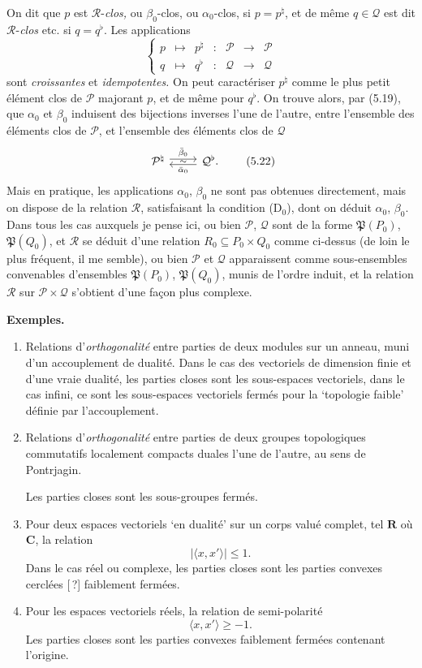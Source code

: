 \documentclass[11pt]{article}
\def\dcprintedpending{}
\newcommand{\msp}[1]{\marginpar{\footnotesize\raggedright
  \ifx\dcprintedpending\empty\else p.~\dcprintedpending\par\fi
  [#1]}\gdef\dcprintedpending{}}
\newcommand{\cP}{\mathcal{P}}
\newcommand{\cQ}{\mathcal{Q}}
\newcommand{\cR}{\mathcal{R}}
\newcommand{\fP}{\mathfrak{P}}
\begin{document}
On dit que $p$ est $\cR$-\textit{clos,} ou $\beta_0$-clos, ou $\alpha_0$-clos, si $p = p^{\natural}$, et de même $q \in \cQ$ est dit $\cR$-\textit{clos} etc. si $q = q^{\flat}$. Les applications
\[
\left\{
\begin{array}{ccccccc}
p & \longmapsto & p^{\natural} & : & \cP & \longrightarrow & \cP\\[1ex]
q & \longmapsto & q^{\flat} & : & \cQ & \longrightarrow & \cQ
\end{array}
\right.
\tag*{(5.21)}
\]
sont \textit{croissantes} et \textit{idempotentes.} On peut caractériser $p^{\natural}$ comme le plus petit élément clos de $\cP$ majorant $p$, et de même pour $q^{\flat}$. On trouve alors, par (5.19), que $\alpha_0$ et $\beta_0$ induisent des bijections inverses l'une de l'autre,
\msp{78}
entre l'ensemble des éléments clos de $\cP$, et l'ensemble des éléments clos de $\cQ$
\[
\begin{tikzcd}
\cP^{\natural} \arrow[r, shift left, "\bar{\beta}_0"] \arrow[r, phantom, "\scriptstyle\sim"] & \cQ^{\flat}. \arrow[l, shift left, "\bar{\alpha}_0"]
\end{tikzcd}
\tag*{(5.22)}
\]
Mais en pratique, les applications $\alpha_0$, $\beta_0$ ne sont pas obtenues directement, mais on dispose de la relation $\cR$, satisfaisant la condition (D$_0$), dont on déduit $\alpha_0$, $\beta_0$. Dans tous les cas auxquels je pense ici, ou bien $\cP$, $\cQ$ sont de la forme $\fP(P_0)$, $\fP(Q_0)$, et $\cR$ se déduit d'une relation $R_0 \subseteq P_0 \times Q_0$ comme ci-dessus (de loin le plus fréquent, il me semble), ou bien $\cP$ et $\cQ$ apparaissent comme sous-ensembles convenables d'ensembles $\fP(P_0)$, $\fP(Q_0)$, munis de l'ordre induit, et la relation $\cR$ sur $\cP \times \cQ$ s'obtient d'une façon plus complexe.

\noindent\textbf{Exemples.}
\begin{enumerate}[label={\arabic*)}]
\item Relations d'\textit{orthogonalité} entre parties de deux modules sur un anneau, muni d'un accouplement de dualité. Dans le cas des vectoriels de dimension finie et d'une vraie dualité, les parties closes sont les sous-espaces vectoriels, dans le cas infini, ce sont les sous-espaces vectoriels fermés pour la `topologie faible' définie par l'accouplement.
\item Relations d'\textit{orthogonalité} entre parties de deux groupes topologiques commutatifs localement compacts duales l'une de l'autre, au sens de Pontrjagin.
\msp{79}

Les parties closes sont les sous-groupes fermés.
\item Pour deux espaces vectoriels `en dualité' sur un corps valué complet, tel $\mathbf{R}$ où $\mathbf{C}$, la relation %
\[
|\langle x, x' \rangle| \leq 1.
\]
Dans le cas réel ou complexe, les parties closes sont les parties convexes cerclées [\,?] faiblement fermées.
\item Pour les espaces vectoriels réels, la relation de semi-polarité
\[
\langle x, x' \rangle \geq -1.
\]
Les parties closes sont les parties convexes faiblement fermées contenant l'origine.
\end{enumerate}
\end{document}
